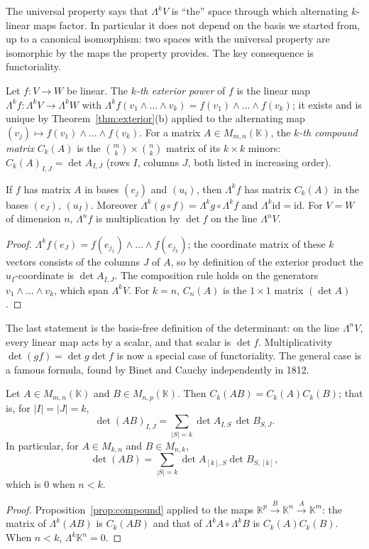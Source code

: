 The universal property says that $\Lambda^kV$ is ``the'' space through which alternating $k$-linear maps factor. In
particular it does not depend on the basis we started from, up to a canonical isomorphism: two spaces with the universal
property are isomorphic by the maps the property provides. The key consequence is functoriality.

\begin{definition}\label{def:compound}
Let $f:V\to W$ be linear. The \emph{$k$-th exterior power} of $f$ is the linear map $\Lambda^kf:\Lambda^kV\to\Lambda^kW$
with $\Lambda^kf(v_1\wedge\dots\wedge v_k)=f(v_1)\wedge\dots\wedge f(v_k)$; it exists and is unique by
Theorem~\ref{thm:exterior}(b) applied to the alternating map $(v_j)\mapsto f(v_1)\wedge\dots\wedge f(v_k)$. For a matrix
$A\in M_{m,n}(\mathbb K)$, the \emph{$k$-th compound matrix} $C_k(A)$ is the $\binom mk\times\binom nk$ matrix of its
$k\times k$ minors: $C_k(A)_{I,J}=\det A_{I,J}$ (rows $I$, columns $J$, both listed in increasing order).
\end{definition}

\begin{proposition}\label{prop:compound}
If $f$ has matrix $A$ in bases $(e_j)$ and $(u_i)$, then $\Lambda^kf$ has matrix $C_k(A)$ in the bases $(e_J)$, $(u_I)$.
Moreover $\Lambda^k(g\circ f)=\Lambda^kg\circ\Lambda^kf$ and $\Lambda^k\mathrm{id}=\mathrm{id}$. For $V=W$ of dimension $n$,
$\Lambda^nf$ is multiplication by $\det f$ on the line $\Lambda^nV$.
\end{proposition}
\begin{proof}
$\Lambda^kf(e_J)=f(e_{j_1})\wedge\dots\wedge f(e_{j_k})$; the coordinate matrix of these $k$ vectors consists of the columns
$J$ of $A$, so by definition of the exterior product the $u_I$-coordinate is $\det A_{I,J}$. The composition rule holds on
the generators $v_1\wedge\dots\wedge v_k$, which span $\Lambda^kV$. For $k=n$, $C_n(A)$ is the $1\times1$ matrix $(\det A)$.
\end{proof}

The last statement is the basis-free definition of the determinant: on the line $\Lambda^nV$, every linear map acts by a
scalar, and that scalar is $\det f$. Multiplicativity $\det(gf)=\det g\det f$ is now a special case of functoriality.
The general case is a famous formula, found by Binet and Cauchy independently in 1812.

\begin{theorem}\label{thm:cauchybinet}
Let $A\in M_{m,n}(\mathbb K)$ and $B\in M_{n,p}(\mathbb K)$. Then $C_k(AB)=C_k(A)C_k(B)$; that is, for $|I|=|J|=k$,
\[
\det(AB)_{I,J}=\sum_{|S|=k}\det A_{I,S}\,\det B_{S,J}.
\]
In particular, for $A\in M_{k,n}$ and $B\in M_{n,k}$,
\[
\det(AB)=\sum_{|S|=k}\det A_{[k],S}\det B_{S,[k]},
\]
which is $0$ when $n<k$.
\end{theorem}
\begin{proof}
Proposition~\ref{prop:compound} applied to the maps $\mathbb K^p\xrightarrow{B}\mathbb K^n\xrightarrow{A}\mathbb K^m$:
the matrix of $\Lambda^k(AB)$ is $C_k(AB)$ and that of $\Lambda^kA\circ\Lambda^kB$ is $C_k(A)C_k(B)$. When $n<k$, $\Lambda^k\mathbb K^n=0$.
\end{proof}

